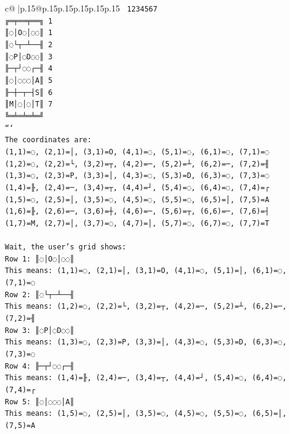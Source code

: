 \documentclass{article}
\begin{document}
{\begin{supertabular}{c@{$\;$}|p{.15\linewidth}@{}p{.15\linewidth}p{.15\linewidth}p{.15\linewidth}p{.15\linewidth}p{.15\linewidth}}
{{{\texttt{ 1234567} \\
\texttt{╔═╤══╤══╗ 1} \\
\texttt{║◌│O◌│◌◌║ 1} \\
\texttt{║◌└┬─┴──╢ 2} \\
\texttt{║◌P│◌D◌◌║ 3} \\
\texttt{╟─┬┘◌◌┌─╢ 4} \\
\texttt{║◌│◌◌◌│A║ 5} \\
\texttt{╟─┼─┬─┤S║ 6} \\
\texttt{║M│◌│◌│T║ 7} \\
\texttt{╚═╧═╧═╧═╝} \\
\texttt{```} \\
\texttt{The coordinates are:} \\
\texttt{(1,1)=◌, (2,1)=│, (3,1)=O, (4,1)=◌, (5,1)=◌, (6,1)=◌, (7,1)=◌} \\
\texttt{(1,2)=◌, (2,2)=└, (3,2)=┬, (4,2)=─, (5,2)=┴, (6,2)=─, (7,2)=╢} \\
\texttt{(1,3)=◌, (2,3)=P, (3,3)=│, (4,3)=◌, (5,3)=D, (6,3)=◌, (7,3)=◌} \\
\texttt{(1,4)=╟, (2,4)=─, (3,4)=┬, (4,4)=┘, (5,4)=◌, (6,4)=◌, (7,4)=┌} \\
\texttt{(1,5)=◌, (2,5)=│, (3,5)=◌, (4,5)=◌, (5,5)=◌, (6,5)=│, (7,5)=A} \\
\texttt{(1,6)=╟, (2,6)=─, (3,6)=┼, (4,6)=─, (5,6)=┬, (6,6)=─, (7,6)=┤} \\
\texttt{(1,7)=M, (2,7)=│, (3,7)=◌, (4,7)=│, (5,7)=◌, (6,7)=◌, (7,7)=T} \\
\\ 
\texttt{Wait, the user's grid shows:} \\
\texttt{Row 1: ║◌│O◌│◌◌║} \\
\texttt{This means: (1,1)=◌, (2,1)=│, (3,1)=O, (4,1)=◌, (5,1)=│, (6,1)=◌, (7,1)=◌} \\
\texttt{Row 2: ║◌└┬─┴──╢} \\
\texttt{This means: (1,2)=◌, (2,2)=└, (3,2)=┬, (4,2)=─, (5,2)=┴, (6,2)=─, (7,2)=╢} \\
\texttt{Row 3: ║◌P│◌D◌◌║} \\
\texttt{This means: (1,3)=◌, (2,3)=P, (3,3)=│, (4,3)=◌, (5,3)=D, (6,3)=◌, (7,3)=◌} \\
\texttt{Row 4: ╟─┬┘◌◌┌─╢} \\
\texttt{This means: (1,4)=╟, (2,4)=─, (3,4)=┬, (4,4)=┘, (5,4)=◌, (6,4)=◌, (7,4)=┌} \\
\texttt{Row 5: ║◌│◌◌◌│A║} \\
\texttt{This means: (1,5)=◌, (2,5)=│, (3,5)=◌, (4,5)=◌, (5,5)=◌, (6,5)=│, (7,5)=A} \\
}}}
\end{supertabular}}
\end{document}
